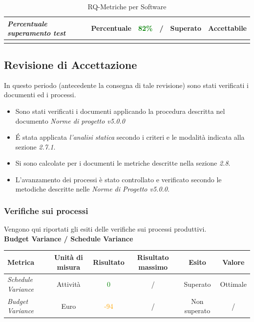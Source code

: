 {\begin{longtable}{|>{\centering}m{2cm}|c|c|c|c|c|}
  	
  	\emph{Percentuale superamento test} & {Percentuale} & \textcolor{Green}{82\%} & / & Superato & Accettabile\\ \hline
  	
  	 
  	\caption{RQ-Metriche per Software}\\
  \end{longtable}

  \subsection{Revisione di Accettazione}
  
  In questo periodo (antecedente la consegna di tale revisione) sono stati verificati i documenti ed i processi.
  
  \begin{itemize}
  	\item Sono stati verificati i documenti applicando la procedura descritta nel documento \emph{Norme di progetto v5.0.0}
  	\item \'E stata applicata \emph{l'analisi statica} secondo i criteri e le modalità indicata alla sezione \emph{2.7.1}.
  	\item Si sono calcolate per i documenti le metriche descritte nella sezione \emph{2.8}.
  	
  	\item L’avanzamento dei processi è stato controllato e verificato secondo le metodiche descritte nelle \emph{Norme di Progetto v5.0.0}.
  	
  \end{itemize}
  \subsubsection{Verifiche sui processi}
  
  Vengono qui riportati gli esiti delle verifiche sui processi produttivi.\\
  
  
  \textbf{Budget Variance / Schedule Variance}
  \begin{longtable}{|>{\centering}m{2cm}|c|c|c|c|c|}
  	\hline
  	\textbf{Metrica} & \textbf{Unità di misura} & \textbf{Risultato} & \textbf{Risultato massimo} & \textbf{Esito} & \textbf{Valore}\\
  	\hline
  	\endhead
  	\emph{Schedule Variance} & {Attività} & \textcolor{Green}{0} & / & Superato & Ottimale\\ \hline
  	\emph{Budget Variance} & {Euro} & \textcolor{Orange}{-94} & / & Non superato & /\\ \hline
  	

\end{longtable}}
